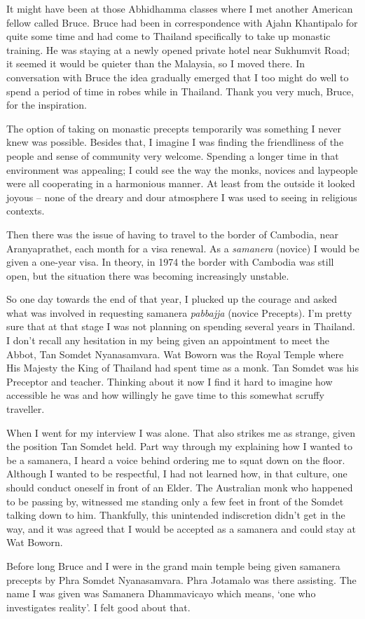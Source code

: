 It might have been at those Abhidhamma classes where I met another
American fellow called Bruce. Bruce had been in correspondence with
Ajahn Khantipalo for quite some time and had come to Thailand
specifically to take up monastic training. He was staying at a newly
opened private hotel near Sukhumvit Road; it seemed it would be quieter
than the Malaysia, so I moved there. In conversation with Bruce the idea
gradually emerged that I too might do well to spend a period of time in
robes while in Thailand. Thank you very much, Bruce, for the
inspiration.

The option of taking on monastic precepts temporarily was something I
never knew was possible. Besides that, I imagine I was finding the
friendliness of the people and sense of community very welcome. Spending
a longer time in that environment was appealing; I could see the way the
monks, novices and laypeople were all cooperating in a harmonious
manner. At least from the outside it looked joyous -- none of the dreary
and dour atmosphere I was used to seeing in religious contexts.

Then there was the issue of having to travel to the border of Cambodia,
near Aranyaprathet, each month for a visa renewal. As a \emph{samanera}
(novice) I would be given a one-year visa. In theory, in 1974 the border
with Cambodia\cite{cambodia} was still open, but the situation there was becoming
increasingly unstable.

So one day towards the end of that year, I plucked up the courage and
asked what was involved in requesting samanera \emph{pabbajja} (novice
Precepts). I'm pretty sure that at that stage I was not planning on
spending several years in Thailand. I don't recall any hesitation in my
being given an appointment to meet the Abbot, Tan Somdet Nyanasamvara.
Wat Boworn was the Royal Temple where His Majesty the King of Thailand
had spent time as a monk. Tan Somdet was his Preceptor and teacher.
Thinking about it now I find it hard to imagine how accessible he was
and how willingly he gave time to this somewhat scruffy traveller.

When I went for my interview I was alone. That also strikes me as
strange, given the position Tan Somdet held. Part way through my
explaining how I wanted to be a samanera, I heard a voice behind
ordering me to squat down on the floor. Although I wanted to be
respectful, I had not learned how, in that culture, one should conduct
oneself in front of an Elder. The Australian monk who happened to be
passing by, witnessed me standing only a few feet in front of the Somdet
talking down to him. Thankfully, this unintended indiscretion didn't get
in the way, and it was agreed that I would be accepted as a samanera and
could stay at Wat Boworn.

Before long Bruce and I were in the grand main temple being given
samanera precepts by Phra Somdet Nyanasamvara. Phra Jotamalo was there
assisting. The name I was given was Samanera Dhammavicayo which means,
`one who investigates reality'. I felt good about that.

